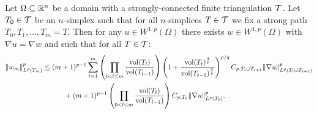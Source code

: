\documentclass[a4paper]{article}
\begin{document}
\begin{theorem}\label{theorem:poincarefriedrichsestimate:grad}
    Let $\Omega \subseteq {\mathbb R}^{n}$ be a domain with a strongly-connected finite triangulation ${\mathcal T}$.
    Let $T_0 \in {\mathcal T}$ be an $n$-simplex such that for all $n$-simplices $T \in {\mathcal T}$ 
    we fix a strong path $T_0, T_1, \dots, T_m = T$.
    Then for any $u \in W^{1,p}(\Omega)$ 
    there exists $w \in W^{1,p}(\Omega)$ with $\nabla u = \nabla w$ 
    and such that for all $T \in {\mathcal T}$:
    \begin{align*}
        \| w_{m} \|_{L^{p}(T_m)}^{p}
        &\leq 
        (m+1)^{p-1}
        \sum_{t=1}^{m} 
        \left( 
            \prod_{t < l \leq m} 
            \frac{ \operatorname{vol}(T_l) }{ \operatorname{vol}(T_{l-1}) } 
        \right)
        \left( 1 + \frac{ \operatorname{vol}(T_t)^{\frac q p} }{ \operatorname{vol}(T_{t-1})^{\frac q p} } \right)^{p/q}
        C_{p,T_{t} \cup T_{t+1}}
        \| \nabla u \|_{L^{p}( T_{t} \cup T_{t+1} )}^{p}
        \\&\quad \quad \quad 
        +
        (m+1)^{p-1}
        \left( 
            \prod_{0 < l \leq m} 
            \frac{ \operatorname{vol}(T_l) }{ \operatorname{vol}(T_{l-1}) } 
        \right)
        C_{p,T_{0}}
        \| \nabla u \|_{L^{p}(T_{0})}^{p}
        .
    \end{align*}
\end{theorem}
\end{document}
